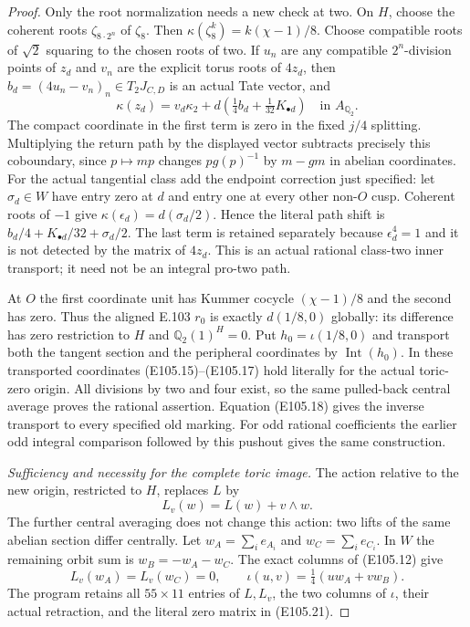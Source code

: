 \begin{proof}
Only the root normalization needs a new check at two.
On $H$, choose the coherent roots
$\zeta_{8\cdot2^n}$ of $\zeta_8$.  Then
$\kappa(\zeta_8^k)=k(\chi-1)/8$.
Choose compatible roots of $\sqrt2$ squaring to the
chosen roots of two.  If $u_n$ are any compatible
$2^n$-division points of $z_d$ and $v_n$ are the explicit
torus roots of $4z_d$, then
$b_d=(4u_n-v_n)_n\in T_2J_{C,D}$ is an actual Tate vector,
and
\[
 \kappa(z_d)=v_d\kappa_2+
        d\left(\tfrac14b_d+\tfrac1{32}K_{\bullet d}\right)
             \quad\text{in }A_{\mathbb Q_2}.
 \tag{E105.19}
\]
The compact coordinate in the first term is zero in
the fixed $j/4$ splitting.  Multiplying the return path
by the displayed vector subtracts precisely this
coboundary, since $p\mapsto m p$ changes
$p g(p)^{-1}$ by $m-gm$ in abelian coordinates.
For the actual tangential class add the endpoint correction
just specified: let $\sigma_d\in W$ have entry zero at $d$
and entry one at every other non-$O$ cusp.
Coherent roots of $-1$ give
$\kappa(\epsilon_d)=d(\sigma_d/2)$.
Hence the literal path shift is
$b_d/4+K_{\bullet d}/32+\sigma_d/2$.
The last term is retained separately because
$\epsilon_d^4=1$ and it is not detected by the matrix of
$4z_d$.  This is an actual rational class-two inner
transport; it need not be an integral pro-two path.

At $O$ the first coordinate unit has Kummer cocycle
$(\chi-1)/8$ and the second has zero.
Thus the aligned E.103 $r_0$ is exactly
$d(1/8,0)$ globally: its difference has zero restriction
to $H$ and $\mathbb Q_2(1)^H=0$.
Put $h_0=\iota(1/8,0)$ and transport both the tangent
section and the peripheral coordinates by
$\operatorname{Int}(h_0)$.
In these transported coordinates (E105.15)--(E105.17)
hold literally for the actual toric-zero origin.
All divisions by two and four exist, so the same
pulled-back central average proves the rational assertion.
Equation (E105.18) gives the inverse transport to every
specified old marking.  For odd rational coefficients
the earlier odd integral comparison followed by this
pushout gives the same construction.

\emph{Sufficiency and necessity for the complete toric image.}
The action relative to the new origin, restricted to $H$,
replaces $L$ by
\[
             L_v(w)=L(w)+v\wedge w.
 \tag{E105.20}
\]
The further central averaging does not change this action:
two lifts of the same abelian section differ centrally.
Let $w_A=\sum_i e_{A_i}$ and $w_C=\sum_i e_{C_i}$.
In $W$ the remaining orbit sum is $w_B=-w_A-w_C$.
The exact columns of (E105.12) give
\[
 L_v(w_A)=L_v(w_C)=0,\qquad
       \iota(u,v)=\tfrac14(uw_A+vw_B).
 \tag{E105.21}
\]
The program retains all $55\times11$ entries of $L,L_v$,
the two columns of $\iota$, their actual retraction, and
the literal zero matrix in (E105.21).


\end{proof}
